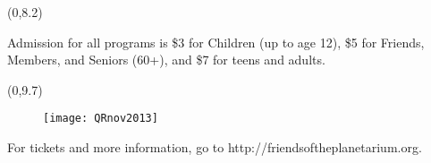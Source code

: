 \documentclass{article}
\begin{document}
\begin{textblock}{3.6}(0,8.2)
   {\fontsize{16}{17}

Admission for all programs is \$3 for Children (up to age 12), \$5 for Friends, Members, and Seniors (60+), and \$7 for teens and adults.

   }
\end{textblock}

\begin{textblock}{3}(0,9.7)

   {\fontsize{18}{19}
\begin{wrapfigure}{l}{0.7in}
   \texttt{[image: QRnov2013]}
\end{wrapfigure}      

For tickets and more information, go to http://friendsoftheplanetarium.org.

}
\end{textblock}
\end{document}
